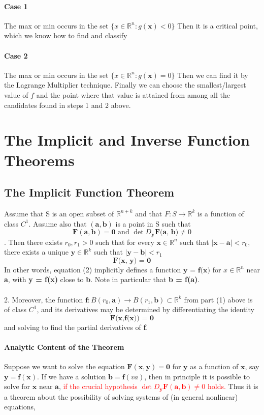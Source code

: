 \documentclass[11pt]{article}
\newcommand{\tb}[1]{\textbf{#1}}
\newcommand{\real}[0]{\mathbb{R}}
\newcommand{\vx}[0]{\tb{x}}
\newcommand{\vy}[0]{\tb{y}}
\newcommand{\vo}[0]{\tb{0}}
\newcommand{\va}[0]{\tb{a}}
\newcommand{\vb}[0]{\tb{b}}
\newcommand{\vf}[0]{\tb{F}}
\newcommand{\ff}[0]{\tb{f}}
\begin{document}
\paragraph{Case 1} The max or min occurs in the set $\{x\in \real^n: g(\tb{x}) < 0\}$ \newline
Then it is a critical point, which we know how to find and classify
\paragraph{Case 2} The max or min occurs in the set $\{x\in \real^n: g(\tb{x}) = 0\}$ \newline
Then we can find it by the Lagrange Multiplier technique. \newline
Finally we can choose the smallest/largest value of $f$ and the point where that value is attained from among all the candidates found in steps 1 and 2 above.
\section{The Implicit and Inverse Function Theorems}
\subsection{The Implicit Function Theorem}
Assume that S is an open subset of $\real^{n+k}$ and that $F: S \rightarrow \real^k$ is a function of class $C^1$. Assume also that $(\tb{a}, \tb{b})$ is a point in S such that $$\tb{F}(\va, \vb)= \vo \mbox{ and } \det D_{\tb{y}}\tb{F(a, b)} \neq 0$$ . Then there exists $r_0, r_1 > 0$ such that for every $\tb{x} \in \real^n$ such that $|\tb{x} - \tb{a}| < r_0$, there exists a unique $\tb{y} \in \real^k$ such that $|\tb{y} - \tb{b}| < r_1$
\begin{equation}
	\tb{F(x, y) = 0}
\end{equation}
    In other words, equation (2) implicitly defines a function $\tb{y = f(x)}$ for $x \in \real^n$ near \tb{a}, with \tb{y = f(x)} close to \tb{b}. Note in particular that \tb{b = f(a)}. \\\\
2. Moreover, the function $\tb{f}: B(r_0,\tb{a}) \rightarrow B(r_1, \tb{b}) \subset \real^k$ from part (1) above is of class $C^1$, and its derivatives may be determined by differentiating the identity $$\tb{F(x,f(x)) = 0}$$ and solving to find the partial derivatives of \tb{f}.
\paragraph{Analytic Content of the Theorem}
Suppose we want to solve the equation $\vf(\vx, \vy) = \vo$ for $\vy$ as a function of $\vx$, say $\vy = \ff(\vx)$. If we have a solution $\vb = \ff(va)$, then in principle it is possible to solve for $\vx$ near $\va$, \textcolor{red}{if the crucial hypothesis $\det D_\vy \vf(\va,\vb) \neq 0$ holds.} Thus it is a theorem about the possibility of solving systems of (in general nonlinear) equations,
\end{document}
